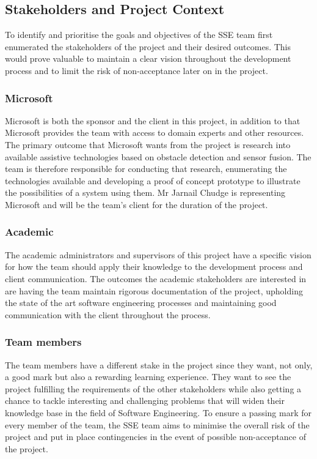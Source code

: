 \documentclass[prodmode,acmtosem]{acmsmall} %
\begin{document}
\subsection{Stakeholders and Project Context}
To identify and prioritise the goals and objectives of the SSE team first enumerated the stakeholders of the project and their desired outcomes. This would prove valuable to maintain a clear vision throughout the development process and to limit the risk of non-acceptance later on in the project.

\subsubsection{Microsoft}
Microsoft is both the sponsor and the client in this project, in addition to that Microsoft provides the team with access to domain experts and other resources. The primary outcome that Microsoft wants from the project is research into available assistive technologies based on obstacle detection and sensor fusion. The team is therefore responsible for conducting that research, enumerating the technologies available and developing a proof of concept prototype to illustrate the possibilities of a system using them.
Mr Jarnail Chudge is representing Microsoft and will be the team's client for the duration of the project.

\subsubsection{Academic}
The academic administrators and supervisors of this project have a specific vision for how the team should apply their knowledge to the development process and client communication.
The outcomes the academic stakeholders are interested in are having the team maintain rigorous documentation of the project, upholding the state of the art software engineering processes and maintaining good communication with the client throughout the process.

\subsubsection{Team members}
The team members have a different stake in the project since they want, not only, a good mark but also a rewarding learning experience.
They want to see the project fulfilling the requirements of the other stakeholders while also getting a chance to tackle interesting and challenging problems that will widen their knowledge base in the field of Software Engineering.
To ensure a passing mark for every member of the team, the SSE team aims to minimise the overall risk of the project and put in place contingencies in the event of possible non-acceptance of the project.
\end{document}

